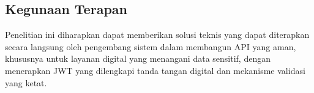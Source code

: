 \subsection{Kegunaan Terapan}
\begin{subsectioncontent}
Penelitian ini diharapkan dapat memberikan solusi teknis yang dapat diterapkan secara langsung oleh pengembang sistem dalam membangun API yang aman, khususnya untuk layanan digital yang menangani data sensitif, dengan menerapkan JWT yang dilengkapi tanda tangan digital dan mekanisme validasi yang ketat.
\end{subsectioncontent}
